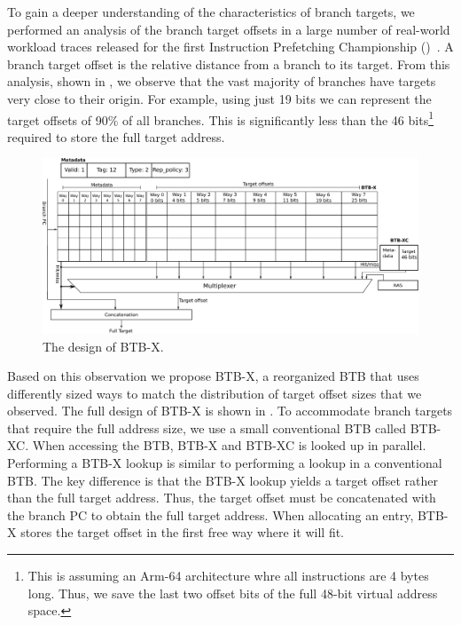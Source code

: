 \documentclass[../main.tex]{subfiles}
\begin{document}
\begin{refsection}
To gain a deeper understanding of the characteristics of branch
targets, we performed an analysis of the branch target offsets in a
large number of real-world workload traces released for the first
Instruction Prefetching Championship
()~\cite{ipc1}. A branch target offset is the
relative distance from a branch to its target. From this analysis,
shown in , we observe that the vast majority of
branches have targets very close to their origin. For example, using
just 19 bits we can represent the target offsets of 90\% of all
branches. This is significantly less than the 46 bits\footnote{This is
  assuming an Arm-64 architecture whre all instructions are 4 bytes
  long. Thus, we save the last two offset bits of the full 48-bit
  virtual address space.} required to store the full target address.

\begin{figure}[ht]
  \centering
  \includegraphics[width=\textwidth]{figures/BTB-X.pdf}
  \caption{\label{fig:btbx-design} The design of BTB-X.}
\end{figure}

Based on this observation we propose BTB-X, a reorganized BTB that
uses differently sized ways to match the distribution of target offset
sizes that we observed. The full design of BTB-X is shown in
. To accommodate branch targets that require the
full address size, we use a small conventional BTB called BTB-XC. When
accessing the BTB, BTB-X and BTB-XC is looked up in
parallel. Performing a BTB-X lookup is similar to performing a lookup
in a conventional BTB. The key difference is that the BTB-X lookup
yields a target offset rather than the full target address. Thus, the
target offset must be concatenated with the branch PC to obtain the
full target address. When allocating an entry, BTB-X stores the target
offset in the first free way where it will fit.


\end{refsection}
\end{document}
